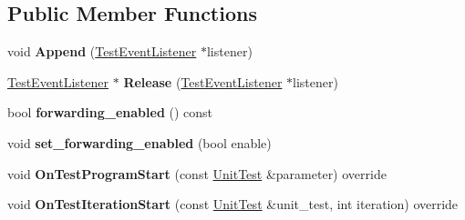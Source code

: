 \subsection*{Public Member Functions}
\begin{DoxyCompactItemize}
\item 
\mbox{\label{classtesting_1_1internal_1_1TestEventRepeater_ad154ce021881721a5c46994316b14cb1}} 
void {\bfseries Append} (\mbox{\hyperlink{classtesting_1_1TestEventListener}{Test\+Event\+Listener}} $\ast$listener)
\item 
\mbox{\label{classtesting_1_1internal_1_1TestEventRepeater_ac77a3d127e4726e11694e4ee9cf3b793}} 
\mbox{\hyperlink{classtesting_1_1TestEventListener}{Test\+Event\+Listener}} $\ast$ {\bfseries Release} (\mbox{\hyperlink{classtesting_1_1TestEventListener}{Test\+Event\+Listener}} $\ast$listener)
\item 
\mbox{\label{classtesting_1_1internal_1_1TestEventRepeater_abaf2bfc453fc0e1005fcfb0f95deac4c}} 
bool {\bfseries forwarding\+\_\+enabled} () const
\item 
\mbox{\label{classtesting_1_1internal_1_1TestEventRepeater_a86c52e311b70598a385a0589277e92e0}} 
void {\bfseries set\+\_\+forwarding\+\_\+enabled} (bool enable)
\item 
\mbox{\label{classtesting_1_1internal_1_1TestEventRepeater_a85205c7c578a6766ad6b5ee98e789348}} 
void {\bfseries On\+Test\+Program\+Start} (const \mbox{\hyperlink{classtesting_1_1UnitTest}{Unit\+Test}} \&parameter) override
\item 
\mbox{\label{classtesting_1_1internal_1_1TestEventRepeater_a98fea6c94833db424e083eff337ef370}} 
void {\bfseries On\+Test\+Iteration\+Start} (const \mbox{\hyperlink{classtesting_1_1UnitTest}{Unit\+Test}} \&unit\+\_\+test, int iteration) override
\item 
\mbox{\label{classtesting_1_1internal_1_1TestEventRepeater_a81471e99f27804c531567ea88be96e9a}} 

\end{DoxyCompactItemize}
